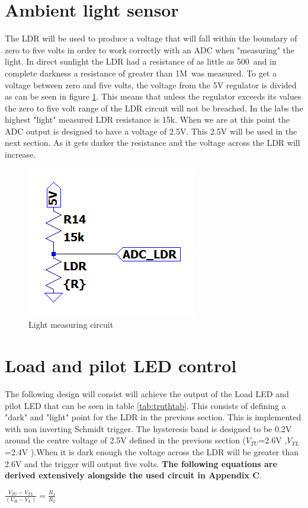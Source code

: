 \section{Ambient light sensor}
The LDR will be used to produce a voltage that will fall within the boundary of zero to five volts in order to work correctly with an ADC when "measuring" the light. In direct sunlight the LDR had a resistance of as little as 500\textohm \ and in complete darkness a resistance of greater than 1M\textohm \ was measured.  To get a voltage between zero and five volts, the voltage from the 5V regulator is divided as can be seen in figure \ref{fig:LDR}. This means that unless the regulator exceeds its values the zero to five volt range of the LDR circuit will not be breached. In the labs the highest "light" measured LDR resistance is 15k\textohm. When we are at this point the ADC output is designed to have a voltage of 2.5V. This 2.5V will be used in the next section. As it gets darker the resistance and the voltage across the LDR will increase.


\begin{figure}[!htb]
	\centering
	\includegraphics[width=0.15\linewidth]{Figures/A7/LDRcirc.png}
	\caption{Light measuring circuit}
	\label{fig:LDR}
\end{figure}

\section{Load and pilot LED control}

The following design will consist will achieve the output of the Load LED and pilot LED that can be seen in table \ref{tab:truthtab}.
 This consists of defining a "dark" and "light" point for the LDR in the previous section. This is implemented with non inverting Schmidt trigger. The hysteresis band is designed to be 0.2V around the centre voltage of 2.5V defined in the previous section ($V_{TU}$=2.6V ,$V_{TL}$=2.4V ).When it is dark enough the voltage across the LDR will be greater than 2.6V and the trigger will output five volts. \textbf{The following equations are derived extensively alongside the used circuit in Appendix C}.

\begin{center}
	$\frac{V_{TU}-V_{TL}}{(V_{H}-V_L)}=\frac{R_1}{R_2}$  
\end{center}

